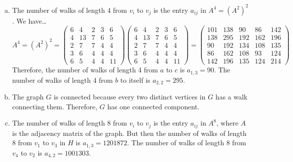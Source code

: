 \documentclass[11pt,letterpaper]{article}
\begin{document}
\begin{enumerate}[(a)]
\item The number of walks of length 4 from $v_i$ to $v_j$ is the entry $a_{ij}$ in $A^4= (A^2)^2$. We have\dots
	\[
	A^4= (A^2)^2= 
	\begin{pmatrix}
	6 & 4 & 2 & 3 & 6 \\
	4 & 13 & 7 & 6 & 5 \\
	2 & 7 & 7 & 4 & 4 \\
	3 & 6 & 4 & 4 & 4 \\
	6 & 5 & 4 & 4 & 11
	\end{pmatrix}
	\begin{pmatrix}
	6 & 4 & 2 & 3 & 6 \\
	4 & 13 & 7 & 6 & 5 \\
	2 & 7 & 7 & 4 & 4 \\
	3 & 6 & 4 & 4 & 4 \\
	6 & 5 & 4 & 4 & 11
	\end{pmatrix}=
	\begin{pmatrix}
	101 & 138 & 90 & 86 & 142 \\
	138 & 295 & 192 & 162 & 196 \\
	90 & 192 & 134 & 108 & 135 \\
	86 & 162 & 108 & 93 & 124 \\
	142 & 196 & 135 & 124 & 214
	\end{pmatrix}
	\]
Therefore, the number of walks of length 4 from $a$ to $c$ is $a_{1,3}= 90$. The number of walks of length 4 from $b$ to itself is $a_{2,2}= 295$. \pspace
 
\item The graph $G$ is connected because every two distinct vertices in $G$ has a walk connecting them. Therefore, $G$ has one connected component. \pspace

\item The number of walks of length 8 from $v_i$ to $v_j$ is the entry $a_{ij}$ in $A^8$, where $A$ is the adjacency matrix of the graph. But then the number of walks of length 8 from $v_1$ to $v_3$ in $H$ is $a_{1,3}= 1201872$. The number of walks of length 8 from $v_4$ to $v_2$ is $a_{4,2}= 1001303$. 
\end{enumerate}



\newpage
\end{document}
